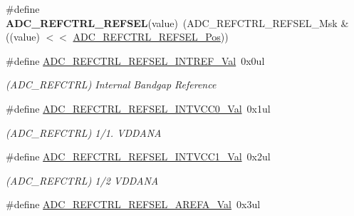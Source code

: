 \begin{DoxyCompactItemize}
\item 
\hypertarget{group___s_a_m_l21___a_d_c_gaeaece8ce2ab79ddd6544075a962bd17c}{}\#define {\bfseries A\+D\+C\+\_\+\+R\+E\+F\+C\+T\+R\+L\+\_\+\+R\+E\+F\+S\+E\+L}(value)~(A\+D\+C\+\_\+\+R\+E\+F\+C\+T\+R\+L\+\_\+\+R\+E\+F\+S\+E\+L\+\_\+\+Msk \& ((value) $<$$<$ \hyperlink{group___s_a_m_l21___a_d_c_ga7b8a65054da09cd11886d730594eb8d3}{A\+D\+C\+\_\+\+R\+E\+F\+C\+T\+R\+L\+\_\+\+R\+E\+F\+S\+E\+L\+\_\+\+Pos}))\label{group___s_a_m_l21___a_d_c_gaeaece8ce2ab79ddd6544075a962bd17c}

\item 
\hypertarget{group___s_a_m_l21___a_d_c_ga1911e56f34fa20c40f0be6888f81cbed}{}\#define \hyperlink{group___s_a_m_l21___a_d_c_ga1911e56f34fa20c40f0be6888f81cbed}{A\+D\+C\+\_\+\+R\+E\+F\+C\+T\+R\+L\+\_\+\+R\+E\+F\+S\+E\+L\+\_\+\+I\+N\+T\+R\+E\+F\+\_\+\+Val}~0x0ul\label{group___s_a_m_l21___a_d_c_ga1911e56f34fa20c40f0be6888f81cbed}

\begin{DoxyCompactList}\small\item\em (A\+D\+C\+\_\+\+R\+E\+F\+C\+T\+R\+L) Internal Bandgap Reference \end{DoxyCompactList}\item 
\hypertarget{group___s_a_m_l21___a_d_c_gae5db462246782f67edf39fecc67bf742}{}\#define \hyperlink{group___s_a_m_l21___a_d_c_gae5db462246782f67edf39fecc67bf742}{A\+D\+C\+\_\+\+R\+E\+F\+C\+T\+R\+L\+\_\+\+R\+E\+F\+S\+E\+L\+\_\+\+I\+N\+T\+V\+C\+C0\+\_\+\+Val}~0x1ul\label{group___s_a_m_l21___a_d_c_gae5db462246782f67edf39fecc67bf742}

\begin{DoxyCompactList}\small\item\em (A\+D\+C\+\_\+\+R\+E\+F\+C\+T\+R\+L) 1/1. V\+D\+D\+A\+N\+A \end{DoxyCompactList}\item 
\hypertarget{group___s_a_m_l21___a_d_c_ga82f083020e2747f258e7be98ce53d76c}{}\#define \hyperlink{group___s_a_m_l21___a_d_c_ga82f083020e2747f258e7be98ce53d76c}{A\+D\+C\+\_\+\+R\+E\+F\+C\+T\+R\+L\+\_\+\+R\+E\+F\+S\+E\+L\+\_\+\+I\+N\+T\+V\+C\+C1\+\_\+\+Val}~0x2ul\label{group___s_a_m_l21___a_d_c_ga82f083020e2747f258e7be98ce53d76c}

\begin{DoxyCompactList}\small\item\em (A\+D\+C\+\_\+\+R\+E\+F\+C\+T\+R\+L) 1/2 V\+D\+D\+A\+N\+A \end{DoxyCompactList}\item 
\hypertarget{group___s_a_m_l21___a_d_c_ga1b593007ede54d3fc5aa91c51eb7d052}{}\#define \hyperlink{group___s_a_m_l21___a_d_c_ga1b593007ede54d3fc5aa91c51eb7d052}{A\+D\+C\+\_\+\+R\+E\+F\+C\+T\+R\+L\+\_\+\+R\+E\+F\+S\+E\+L\+\_\+\+A\+R\+E\+F\+A\+\_\+\+Val}~0x3ul\label{group___s_a_m_l21___a_d_c_ga1b593007ede54d3fc5aa91c51eb7d052}


\end{DoxyCompactItemize}

